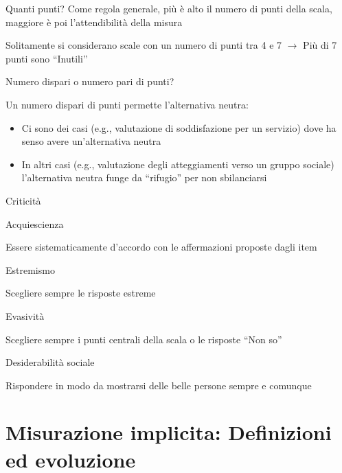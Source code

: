\documentclass[compress]{beamer}
\begin{document}
\begin{frame}{Quanti punti?}
	Come regola generale, più è alto il numero di punti della scala, maggiore è poi l'attendibilità della misura
	
	Solitamente si considerano scale con un numero di punti tra 4 e 7 $\rightarrow$ Più di 7 punti sono ``Inutili''
	
	Numero dispari o numero pari di punti? 
	
	Un numero dispari di punti permette l'alternativa neutra: 
	
	\begin{itemize}
		\item Ci sono dei casi (e.g., valutazione di soddisfazione per un servizio) dove ha senso avere un'alternativa neutra 
		\item In altri casi (e.g., valutazione degli atteggiamenti verso un gruppo sociale) l'alternativa neutra funge da ``rifugio'' per non sbilanciarsi
	\end{itemize}
\end{frame}


\begin{frame}{Criticità}
	\begin{block}{Acquiescienza}
		
		Essere sistematicamente d'accordo con le affermazioni proposte dagli item
	\end{block}
	
\begin{block}{Estremismo}
	
	Scegliere sempre le risposte estreme
\end{block}

\begin{block}{Evasività}
	
	Scegliere sempre i punti centrali della scala o le risposte ``Non so''
\end{block}

\begin{block}{Desiderabilità sociale}
	
Rispondere in modo da mostrarsi delle belle persone sempre e comunque	
\end{block}

\end{frame}
\section[Misurazione implicita]{Misurazione implicita: Definizioni ed evoluzione}
\end{document}
